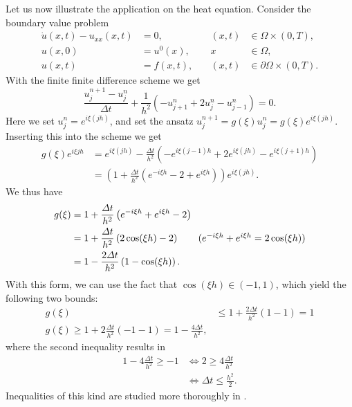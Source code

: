 \documentclass{article}
\begin{document}
Let us now illustrate the application on the heat equation. Consider the boundary value problem
$$ \begin{aligned}
    \dot{u}(x,t) - u_{xx}(x,t) &= 0, &\quad (x,t) &\in \Omega \times (0,T), \\
    u(x,0)                  &= u^0(x), &\quad x &\in \Omega, \\
    u(x,t)                  &= f(x,t), &\quad (x,t) &\in \partial\Omega \times (0,T).
\end{aligned} $$
With the finite finite difference scheme we get
$$ \frac{u^{n+1}_j - u^n_j}{\Delta t} + \frac{1}{h^2} (-u^n_{j+1} +2u^n_j - u^n_{j-1}) = 0.$$
Here we set $u_j^n = e^{i\xi (jh)}$, and set the ansatz $u_j^{n+1} = g(\xi) u_j^n = g(\xi) e^{i\xi (jh)}$. Inserting this into the scheme we get
\begin{align*}
g(\xi) e^{i\xi j h} &= e^{i\xi (jh)} - \frac{\Delta t}{h^2}\left(-e^{i\xi (j-1) h} + 2e^{i\xi (jh)} - e^{i\xi (j+1) h}\right)\\
&= \left(1 + \frac{\Delta t}{h^2}\left(e^{-i\xi h} - 2 + e^{i\xi h}\right)\right)e^{i\xi(jh)}.
\end{align*}
We thus have
\begin{align*}
g(\xi) &= 1 + \frac{\Delta t}{h^2}\left(e^{-i\xi h} + e^{i\xi h}- 2 \right) \\
&= 1 + \frac{\Delta t}{h^2}\left(2\cos(\xi h) - 2\right) \tag{$e^{-i\xi h} + e^{i\xi h} = 2\cos(\xi h)$} \\
&= 1 - \frac{2\Delta t}{h^2}\left(1 - \cos(\xi h)\right).
\end{align*}
With this form, we can use the fact that $\cos(\xi h) \in (-1,1)$, which yield the following two bounds:
\begin{align*}
    g(\xi) &\leq 1 + \frac{2\Delta t}{h^2}(1-1) = 1 \\
    g(\xi) \geq 1 + 2\frac{\Delta t}{h^2}(-1-1)  = 1 - \frac{4\Delta t}{h^2},
\end{align*}
where the second inequality results in
\begin{align*}
    1-4\frac{\Delta t}{h^2} \geq -1 &\iff 2\geq 4\frac{\Delta t}{h^2}\\
    &\iff \Delta t \leq \frac{h^2}{2}.
\end{align*}
Inequalities of this kind are studied more thoroughly in \cite{LeVeque2007}.
\end{document}
